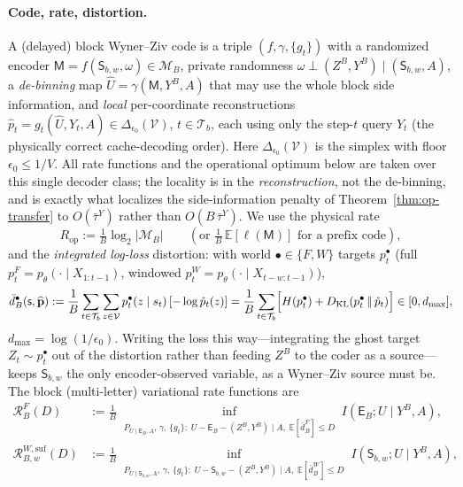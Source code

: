 \documentclass[11pt]{article}
\newcommand{\V}{\mathcal{V}}
\newcommand{\E}{\mathbb{E}}
\newcommand{\phat}{\hat{p}}
\newcommand{\KL}[2]{D_{\mathrm{KL}}(#1 \,\|\, #2)}
\theoremstyle{plain}
\theoremstyle{definition}
\theoremstyle{remark}
\begin{document}
\paragraph{Code, rate, distortion.}
A (delayed) block Wyner--Ziv code is a triple $(f,\gamma,\{g_t\})$ with
a randomized encoder $\mathsf M=f(\mathsf S_{b,w},\omega)\in\mathcal M_B$,
private randomness $\omega\perp(Z^B,Y^B)\mid(\mathsf S_{b,w},A)$, a
\emph{de-binning} map $\hat U=\gamma(\mathsf M,Y^B,A)$ that may use the
whole block side information, and \emph{local} per-coordinate
reconstructions $\phat_t=g_t(\hat U,Y_t,A)\in\Delta_{\epsilon_0}(\V)$,
$t\in\mathcal T_b$, each using only the step-$t$ query $Y_t$ (the
physically correct cache-decoding order). Here
$\Delta_{\epsilon_0}(\V)$ is the simplex with floor $\epsilon_0\le 1/V$.
All rate functions and the operational optimum below are taken over
this single decoder class; the locality is in the
\emph{reconstruction}, not the de-binning, and is exactly what
localizes the side-information penalty of
Theorem~\ref{thm:op-transfer} to $O(\bar\tau^Y)$ rather than
$O(B\,\bar\tau^Y)$. We use the physical rate
\begin{equation}
R_{\mathrm{op}}:=\tfrac1B\log_2|\mathcal M_B|
\qquad(\text{or }\tfrac1B\,\E[\ell(\mathsf M)]\text{ for a prefix code}),
\end{equation}
and the \emph{integrated log-loss} distortion: with world
$\bullet\in\{F,W\}$ targets $p_t^\bullet$ (full $p_t^F=p_\theta(\cdot\mid X_{1:t-1})$,
windowed $p_t^W=p_\theta(\cdot\mid X_{t-w:t-1})$),
\begin{equation}
\label{eq:op-distortion}
\bar d_B^{\bullet}(\mathsf s,\widehat{\mathbf p})
:=\frac1B\sum_{t\in\mathcal T_b}\sum_{z\in\V}p_t^\bullet(z\mid s_t)\,[-\log\phat_t(z)]
=\frac1B\sum_{t\in\mathcal T_b}\Bigl[H(p_t^\bullet)+\KL{p_t^\bullet}{\phat_t}\Bigr]\in[0,d_{\max}],
\end{equation}
$d_{\max}=\log(1/\epsilon_0)$. Writing the loss this way---integrating
the ghost target $Z_t\sim p_t^\bullet$ out of the distortion rather
than feeding $Z^B$ to the coder as a source---keeps $\mathsf S_{b,w}$
the only encoder-observed variable, as a Wyner--Ziv source must be.
The block (multi-letter) variational rate functions are
\begin{align}
\label{eq:op-rate-fns}
\mathcal R^{F}_{B}(D)&:=\tfrac1B\inf_{\substack{P_{U\mid \mathsf E_B,A},\,\gamma,\,\{g_t\}:\;
U-\mathsf E_B-(Z^B,Y^B)\mid A,\;\E[\bar d_B^F]\le D}}I(\mathsf E_B;U\mid Y^B,A),\\
\mathcal R^{W,\mathrm{suf}}_{B,w}(D)&:=\tfrac1B\inf_{\substack{P_{U\mid \mathsf S_{b,w},A},\,\gamma,\,\{g_t\}:\;
U-\mathsf S_{b,w}-(Z^B,Y^B)\mid A,\;\E[\bar d_B^W]\le D}}I(\mathsf S_{b,w};U\mid Y^B,A),
\end{align}
\end{document}
